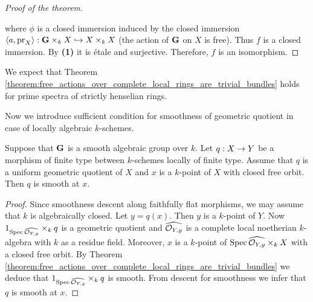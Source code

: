 \begin{proof}[Proof of the theorem]
\begin{center}
\end{center}
where $\phi$ is a closed immersion induced by the closed immersion $\langle a, \mathrm{pr}_X\rangle:\mathbf{G}\times_kX  \hookrightarrow   X\times_kX$ (the action of $\mathbf{G}$ on $X$ is free). Thus $f$ is a closed immersion. By \textbf{(1)} it is {\'e}tale and surjective. Therefore, $f$ is an isomorphism.  
\end{proof}

\begin{remark}\label{remark:principal_bundles_of_strictly_henselian_rings}
We expect that Theorem \ref{theorem:free_actions_over_complete_local_rings_are_trivial_bundles} holds for prime spectra of strictly henselian rings.
\end{remark}
\noindent
Now we introduce sufficient condition for smoothness of geometric quotient in case of locally algebraic $k$-schemes.

\begin{corollary}\label{corollary:sufficient_condition_for_smoothness_of_geometric_quotient}
Suppose that $\mathbf{G}$ is a smooth algebraic group over $k$. Let $q:X\rightarrow Y$ be a morphism of finite type between $k$-schemes locally of finite type. Assume that $q$ is a uniform geometric quotient of $X$ and $x$ is a $k$-point of $X$ with closed free orbit. Then $q$ is smooth at $x$.
\end{corollary}
\begin{proof}
Since smoothness descent along faithfully flat morphisms, we may assume that $k$ is algebraically closed. Let $y = q(x)$. Then $y$ is a $k$-point of $Y$. Now $1_{\mathrm{Spec}\, \widehat{{\mathcal O}_{Y,y}}}\times_kq$ is a geometric quotient and $\widehat{{\mathcal O}_{Y,y}}$ is a complete local noetherian $k$-algebra with $k$ as a residue field. Moreover, $x$ is a $k$-point of $\mathrm{Spec}\, \widehat{{\mathcal O}_{Y,y}}\times_kX$ with a closed free orbit. By Theorem \ref{theorem:free_actions_over_complete_local_rings_are_trivial_bundles} we deduce that $1_{\mathrm{Spec}\, \widehat{{\mathcal O}_{Y,y}}}\times_k q$ is smooth. From descent for smoothness we infer that $q$ is smooth at $x$.
\end{proof}

